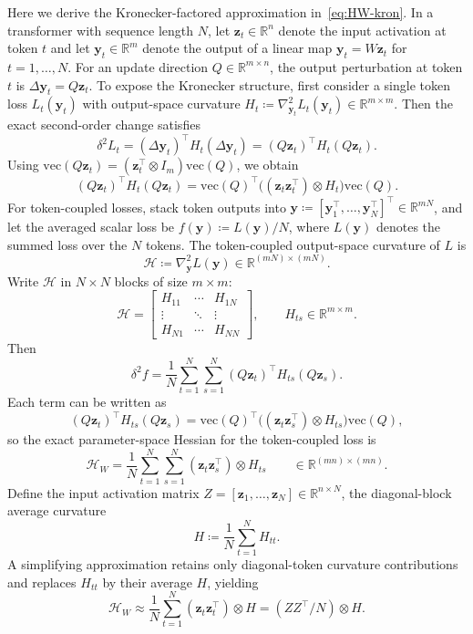 \documentclass[11pt]{article}
\newcommand{\R}{\mathbb{R}}
\newcommand{\vecop}{\mathrm{vec}}
\begin{document}
Here we derive the Kronecker-factored approximation in~\eqref{eq:HW-kron}.
In a transformer with sequence length $N$, let $\boldsymbol{z}_t\in\R^{n}$ denote the input activation at token $t$ and let $\boldsymbol{y}_t\in\R^{m}$ denote the output of a linear map $\boldsymbol{y}_t={W}\boldsymbol{z}_t$ for $t=1,\dots,N$. For an update direction ${Q}\in\R^{m\times n}$, the output perturbation at token $t$ is $\Delta \boldsymbol{y}_t={Q}\boldsymbol{z}_t$.
To expose the Kronecker structure, first consider a single token loss $L_t(\boldsymbol{y}_t)$ with output-space curvature ${H}_t \coloneqq \nabla_{\boldsymbol{y}_t}^2 L_t(\boldsymbol{y}_t)\in\R^{m\times m}$.
Then the exact second-order change satisfies
\[
  \delta^2 L_t
  = (\Delta \boldsymbol{y}_t)^\top {H}_t (\Delta \boldsymbol{y}_t)
  = ({Q}\boldsymbol{z}_t)^\top {H}_t ({Q}\boldsymbol{z}_t).
\]
Using $\vecop({Q}\boldsymbol{z}_t)=(\boldsymbol{z}_t^\top\otimes {I}_m)\vecop({Q})$, we obtain
\[
  ({Q}\boldsymbol{z}_t)^\top {H}_t ({Q}\boldsymbol{z}_t)
  =
  \vecop({Q})^\top\Big((\boldsymbol{z}_t\boldsymbol{z}_t^\top)\otimes {H}_t\Big)\vecop({Q}).
\]
For token-coupled losses, stack token outputs into $\boldsymbol{y} \coloneqq [\boldsymbol{y}_1^\top,\dots,\boldsymbol{y}_N^\top]^\top \in \R^{mN}$,
and let the averaged scalar loss be $f(\boldsymbol{y}) \coloneqq L(\boldsymbol{y})/N$, where $L(\boldsymbol{y})$ denotes the summed loss over the $N$ tokens. The token-coupled output-space curvature of $L$ is
\[
  \mathscr{H}  \coloneqq  \nabla_{\boldsymbol{y}}^2 L(\boldsymbol{y})\in\R^{(mN)\times(mN)}.
\]
Write $\mathscr{H}$ in $N\times N$ blocks of size $m\times m$:
\[
  \mathscr{H} =
  \begin{bmatrix}
    {H}_{11} & \cdots & {H}_{1N}\\
    \vdots & \ddots & \vdots\\
    {H}_{N1} & \cdots & {H}_{NN}
  \end{bmatrix},
  \qquad
  {H}_{ts}\in\R^{m\times m}.
\]
Then
\[
  \delta^2 f
   = 
  \frac{1}{N}\sum_{t=1}^N\sum_{s=1}^N ({Q}\boldsymbol{z}_t)^\top {H}_{ts} ({Q}\boldsymbol{z}_s).
\]
Each term can be written as
\[
  ({Q}\boldsymbol{z}_t)^\top {H}_{ts} ({Q}\boldsymbol{z}_s)
  =
  \vecop({Q})^\top\Big((\boldsymbol{z}_t \boldsymbol{z}_s^\top)\otimes {H}_{ts}\Big)\vecop({Q}),
\]
so the exact parameter-space Hessian for the token-coupled loss is
\begin{equation}
  \label{eq:HW-transformer-exact}
  {\mathcal{H}}_{{W}}
   = 
  \frac{1}{N}\sum_{t=1}^N\sum_{s=1}^N (\boldsymbol{z}_t \boldsymbol{z}_s^\top)\otimes {H}_{ts}
  \qquad\in\R^{(mn)\times(mn)}.
\end{equation}
Define the input activation matrix ${Z}=[\boldsymbol{z}_1,\dots,\boldsymbol{z}_N]\in\R^{n\times N}$,
the diagonal-block average curvature
\[
  {H}  \coloneqq  \frac{1}{N}\sum_{t=1}^N {H}_{tt}.
\]
A simplifying approximation retains only diagonal-token curvature contributions and replaces ${H}_{tt}$ by their average ${H}$,
yielding
\begin{equation}
  \label{eq:HW-transformer-kron}
  {\mathcal{H}}_{{W}}
   \approx 
  \frac{1}{N}\sum_{t=1}^N (\boldsymbol{z}_t \boldsymbol{z}_t^\top)\otimes {H}
   = 
  ({Z}{Z}^\top/N)\otimes {H}.
\end{equation}
\end{document}
